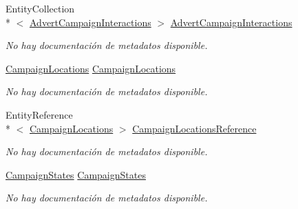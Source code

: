 \begin{DoxyCompactItemize}
Entity\-Collection\\*
$<$ \hyperlink{class_microsoft_1_1_samples_1_1_kinect_1_1_basic_interactions_1_1_advert_campaign_interactions}{Advert\-Campaign\-Interactions} $>$ \hyperlink{class_microsoft_1_1_samples_1_1_kinect_1_1_basic_interactions_1_1_advert_campaigns_a16d52cf1c9d5c3f8e85a16adb8a19dfd}{Advert\-Campaign\-Interactions}
\begin{DoxyCompactList}\small\item\em No hay documentación de metadatos disponible. \end{DoxyCompactList}\item 
\hyperlink{class_microsoft_1_1_samples_1_1_kinect_1_1_basic_interactions_1_1_campaign_locations}{Campaign\-Locations} \hyperlink{class_microsoft_1_1_samples_1_1_kinect_1_1_basic_interactions_1_1_advert_campaigns_a41c115ff75c9c65e40929fe71590ed54}{Campaign\-Locations}
\begin{DoxyCompactList}\small\item\em No hay documentación de metadatos disponible. \end{DoxyCompactList}\item 
Entity\-Reference\\*
$<$ \hyperlink{class_microsoft_1_1_samples_1_1_kinect_1_1_basic_interactions_1_1_campaign_locations}{Campaign\-Locations} $>$ \hyperlink{class_microsoft_1_1_samples_1_1_kinect_1_1_basic_interactions_1_1_advert_campaigns_abf42177d7085ceb26def0e1a35cba0ec}{Campaign\-Locations\-Reference}
\begin{DoxyCompactList}\small\item\em No hay documentación de metadatos disponible. \end{DoxyCompactList}\item 
\hyperlink{class_microsoft_1_1_samples_1_1_kinect_1_1_basic_interactions_1_1_campaign_states}{Campaign\-States} \hyperlink{class_microsoft_1_1_samples_1_1_kinect_1_1_basic_interactions_1_1_advert_campaigns_a0ef3b3bd2e229cd7fdfb940f750decaa}{Campaign\-States}
\begin{DoxyCompactList}\small\item\em No hay documentación de metadatos disponible. \end{DoxyCompactList}\item 

\end{DoxyCompactItemize}
